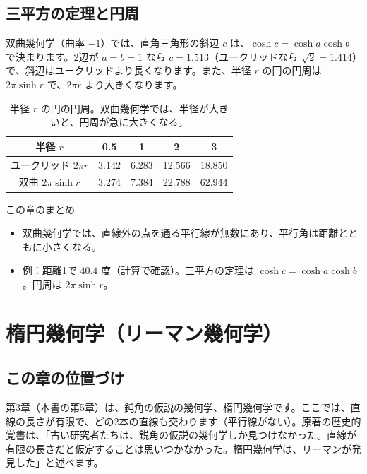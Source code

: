 \documentclass[a4paper,11pt,openany]{ltjsbook}
\begin{document}
\section{三平方の定理と円周}

双曲幾何学（曲率 $-1$）では、直角三角形の斜辺 $c$ は、$\cosh c=\cosh a\cosh b$ で決まります。2辺が $a=b=1$ なら $c=1.513$（ユークリッドなら $\sqrt2=1.414$）で、斜辺はユークリッドより長くなります。また、半径 $r$ の円の円周は $2\pi\sinh r$ で、$2\pi r$ より大きくなります。

\begin{table}[htbp]
\centering
\begin{tabular}{c|cccc}
\toprule
半径 $r$ & 0.5 & 1 & 2 & 3\\
\midrule
ユークリッド $2\pi r$ & 3.142 & 6.283 & 12.566 & 18.850\\
双曲 $2\pi\sinh r$ & 3.274 & 7.384 & 22.788 & 62.944\\
\bottomrule
\end{tabular}
\caption{半径 $r$ の円の円周。双曲幾何学では、半径が大きいと、円周が急に大きくなる。}
\end{table}

\begin{pointbox}{この章のまとめ}
\begin{itemize}[leftmargin=*]
\item 双曲幾何学では、直線外の点を通る平行線が無数にあり、平行角は距離とともに小さくなる。
\item 例：距離1で $40.4$ 度（計算で確認）。三平方の定理は $\cosh c=\cosh a\cosh b$。円周は $2\pi\sinh r$。
\end{itemize}
\end{pointbox}

\chapter{楕円幾何学（リーマン幾何学）}

\section{この章の位置づけ}

第3章（本書の第5章）は、鈍角の仮説の幾何学、楕円幾何学です。ここでは、直線の長さが有限で、どの2本の直線も交わります（平行線がない）。原著の歴史的覚書は、「古い研究者たちは、鋭角の仮説の幾何学しか見つけなかった。直線が有限の長さだと仮定することは思いつかなかった。楕円幾何学は、リーマンが発見した」と述べます。
\end{document}
